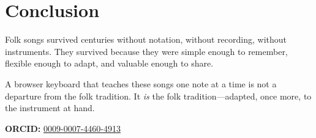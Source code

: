 \documentclass[10pt,letterpaper,twocolumn]{article}
\begin{document}
\section{Conclusion}

Folk songs survived centuries without notation, without recording, without instruments. They survived because they were simple enough to remember, flexible enough to adapt, and valuable enough to share.

A browser keyboard that teaches these songs one note at a time is not a departure from the folk tradition. It \emph{is} the folk tradition---adapted, once more, to the instrument at hand.

\vspace{0.5em}
\noindent\textbf{ORCID:} \href{https://orcid.org/0009-0007-4460-4913}{0009-0007-4460-4913}



\end{document}
